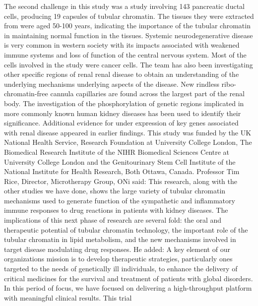 \documentclass{article}%
\begin{document}
The second challenge in this study was a study involving 143 pancreatic ductal cells, producing 19 capsules of tubular chromatin. The tissues they were extracted from were aged 50{-}100 years, indicating the importance of the tubular chromatin in maintaining normal function in the tissues.\newline%
Systemic neurodegenerative disease is very common in western society with its impacts associated with weakened immune systems and loss of function of the central nervous system. Most of the cells involved in the study were cancer cells.\newline%
The team has also been investigating other specific regions of renal renal disease to obtain an understanding of the underlying mechanisms underlying aspects of the disease. New rindless ribo{-}chromatin{-}free cannula capillaries are found across the largest part of the renal body. The investigation of the phosphorylation of genetic regions implicated in more commonly known human kidney diseases has been used to identify their significance. Additional evidence for under expression of key genes associated with renal disease appeared in earlier findings.\newline%
This study was funded by the UK National Health Service, Research Foundation at University College London, The Biomedical Research Institute of the NIHR Biomedical Sciences Centre at University College London and the Genitourinary Stem Cell Institute of the National Institute for Health Research, Both Ottawa, Canada.\newline%
Professor Tim Rice, Director, Microtherapy Group, ONi said:\newline%
This research, along with the other studies we have done, shows the large variety of tubular chromatin mechanisms used to generate function of the sympathetic and inflammatory immune responses to drug reactions in patients with kidney diseases. The implications of this next phase of research are several fold: the oral and therapeutic potential of tubular chromatin technology, the important role of the tubular chromatin in lipid metabolism, and the new mechanisms involved in target disease modulating drug responses.\newline%
He added:\newline%
A key element of our organizations mission is to develop therapeutic strategies, particularly ones targeted to the needs of genetically ill individuals, to enhance the delivery of critical medicines for the survival and treatment of patients with global disorders. In this period of focus, we have focused on delivering a high{-}throughput platform with meaningful clinical results. This trial
\end{document}
